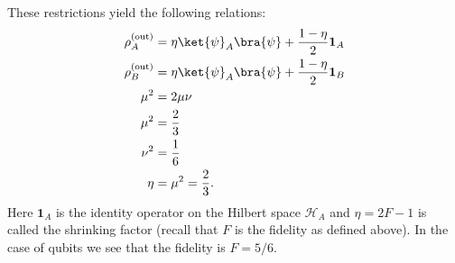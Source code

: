 \documentclass[reqno]{amsart}
\numberwithin{lemma}{section}
\numberwithin{proposition}{section}
\begin{document}
These restrictions yield the following relations:
\begin{align*}
    \rho_{A}^{\text{(out)}} &= \eta \ket{\psi}_{A}\bra{\psi} + \frac{1 - \eta}{2} \mathbf{1}_{A}\\
    \rho_{B}^{\text{(out)}} &= \eta \ket{\psi}_{A} \bra{\psi} + \frac{1 - \eta}{2} \mathbf{1}_{B}\\
    \mu^{2} &= 2\mu \nu\\
    \mu^{2} &= \frac{2}{3}\\
    \nu^{2} &= \frac{1}{6}\\
    \eta &= \mu^{2} = \frac{2}{3}.
\end{align*}
Here $\mathbf{1}_{A}$ is the identity operator on the Hilbert space $\mathcal{H}_{A}$ and $\eta = 2F - 1$ is called the shrinking factor (recall that $F$ is the fidelity as defined above). In the case of qubits we see that the fidelity is $F = 5/6$.
\end{document}
